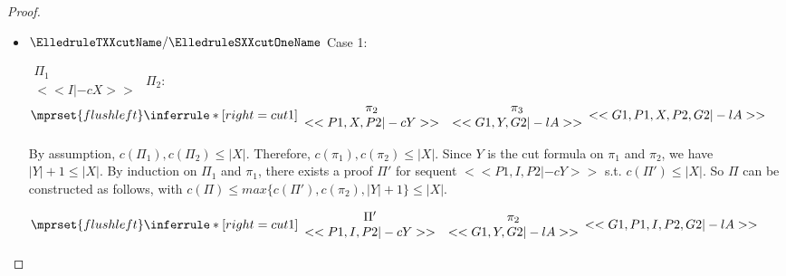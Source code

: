 \begin{proof}
\begin{enumerate}
\begin{itemize}
    \item $\ElledruleTXXcutName/\ElledruleSXXcutOneName$ Case 1:
      \begin{center}
        \scriptsize
        \begin{math}
          \begin{array}{c}
            \Pi_1 \\
            {<<I |-c X>>}
          \end{array}
        \end{math}
        \qquad\qquad
        $\Pi_2:$
        \begin{math}
          $$\mprset{flushleft}
          \inferrule* [right={\tiny cut1}] {
            {
              \begin{array}{cc}
                \pi_2 & \pi_3 \\
                {<<P1, X, P2 |-c Y>>} & {<<G1, Y, G2 |-l A>>}
              \end{array}
            }
          }{<<G1, P1, X, P2, G2 |-l A>>}
        \end{math}
      \end{center}
      By assumption, $c(\Pi_1),c(\Pi_2)\leq |X|$. Therefore, $c(\pi_1),c(\pi_2)\leq |X|$.
      Since $Y$ is the cut formula on $\pi_1$ and $\pi_2$, we have $|Y|+1\leq|X|$. By
      induction on $\Pi_1$ and $\pi_1$, there exists a proof $\Pi'$ for sequent
      $<<P1, I, P2 |-c Y>>$ s.t. $c(\Pi')\leq|X|$. So $\Pi$ can be constructed as follows,
      with $c(\Pi)\leq max\{c(\Pi'),c(\pi_2),|Y|+1\}\leq |X|$.
      \begin{center}
        \scriptsize
        \begin{math}
          $$\mprset{flushleft}
          \inferrule* [right={\tiny cut1}] {
            {
              \begin{array}{cc}
                \Pi' & \pi_2 \\
                {<<P1, I, P2 |-c Y>>} & {<<G1, Y, G2 |-l A>>}
              \end{array}
            }
          }{<<G1, P1, I, P2, G2 |-l A>>}
        \end{math}
      \end{center}


\end{itemize}
\end{enumerate}
\end{proof}
